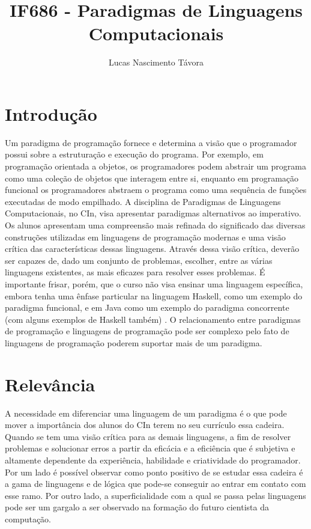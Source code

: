 \documentclass[pt10]{article}
\title{IF686 - Paradigmas de Linguagens Computacionais}
\author{Lucas Nascimento Távora}
\begin{document}
\maketitle


\section{Introdução}

Um paradigma de programação fornece e determina a visão que o programador possui sobre a estruturação e execução do programa. \cite{de2006haskell} Por exemplo, em programação orientada a objetos, os programadores podem abstrair um programa como uma coleção de objetos que interagem entre si, enquanto em programação funcional os programadores abstraem o programa como uma sequência de funções executadas de modo empilhado. A disciplina de Paradigmas de Linguagens Computacionais, no CIn, visa apresentar paradigmas alternativos ao imperativo. Os alunos apresentam uma compreensão mais refinada do significado das diversas construções utilizadas em linguagens de programação modernas e uma visão crítica das características dessas linguagens. Através dessa visão crítica, deverão ser capazes de, dado um conjunto de problemas, escolher, entre as várias linguagens existentes, as mais eficazes para resolver esses problemas. É importante frisar, porém, que o curso não visa ensinar uma linguagem específica, embora tenha uma ênfase particular na linguagem Haskell, como um exemplo do paradigma funcional, e em Java como um exemplo do paradigma concorrente (com alguns exemplos de Haskell também) . O relacionamento entre paradigmas de programação e linguagens de programação pode ser complexo pelo fato de linguagens de programação poderem suportar mais de um paradigma.\cite{lipovaca2011learn} \\
    
\section{Relevância}    
A necessidade em diferenciar uma linguagem de um paradigma é o que pode mover a importância dos alunos do CIn terem no seu currículo essa cadeira. Quando se tem uma visão crítica para as demais linguagens, a fim de resolver problemas e solucionar erros a partir da eficácia e a eficiência que é subjetiva e altamente dependente da experiência, habilidade e criatividade do programador. Por um lado é possível observar como ponto positivo de se estudar essa cadeira é a gama de linguagens e de lógica que pode-se conseguir ao entrar em contato com esse ramo. Por outro lado, a superficialidade com a qual se passa pelas linguagens pode ser um gargalo a ser observado na formação do futuro cientista da computação.\cite{goetz2006java}
\pagebreak
\end{document}
